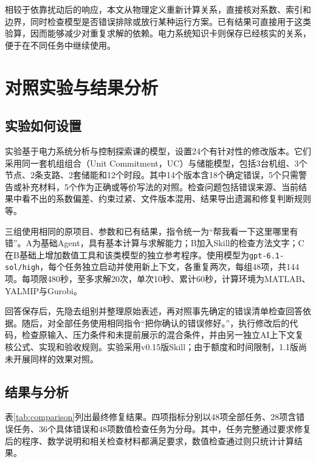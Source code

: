 \documentclass[chinese]{iarticle}
\begin{document}
相较于依靠扰动后的响应，本文从物理定义重新计算关系，直接核对系数、索引和边界，同时检查模型是否错误排除或放行某种运行方案。已有结果可直接用于这类验算，因而能够减少对重复求解的依赖。电力系统知识卡则保存已经核实的关系，便于在不同任务中继续使用。

\section{对照实验与结果分析}

\subsection{实验如何设置}

实验基于电力系统分析与控制探索课的模型，设置24个有针对性的修改版本。它们采用同一套机组组合（Unit Commitment，UC）与储能模型，包括3台机组、3个节点、2条支路、2套储能和12个时段。其中14个版本含18个确定错误，5个只需警告或补充材料，5个作为正确或等价写法的对照。检查问题包括错误来源、当前结果中看不出的系数偏差、约束过紧、文件版本混用、结果导出遗漏和修复判断规则等。

三组使用相同的原项目、参数和已有结果，指令统一为“帮我看一下这里哪里有错”。A为基础Agent，具有基本计算与求解能力；B加入Skill的检查方法文字；C在B基础上增加数值工具和该类模型的独立参考程序。使用模型为\texttt{gpt-6.1-sol/high}，每个任务独立启动并使用新上下文，各重复两次，每组48项，共144项。每项限480秒，至多求解20次，单次10秒、累计60秒，计算环境为MATLAB、YALMIP与Gurobi。

回答保存后，先隐去组别并整理原始表述，再对照事先确定的错误清单检查回答依据\cite{audit}。随后，对全部任务使用相同指令“把你确认的错误修好。”，执行修改后的代码，检查原输入、压力条件和未提前展示的混合条件，并由另一独立AI上下文复核公式、实现和验收规则。实验采用v0.15版Skill；由于额度和时间限制，1.1版尚未开展同样的效果对照。

\newpage
\subsection{结果与分析}

表\ref{tab:comparison}列出最终修复结果。四项指标分别以48项全部任务、28项含错误任务、36个具体错误和48项数值检查任务为分母。其中，任务完整通过要求修复后的程序、数学说明和相关检查材料都满足要求，数值检查通过则只统计计算结果\cite{repair}。
\end{document}
